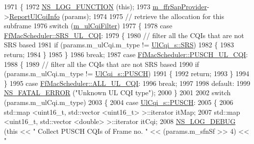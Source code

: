\begin{DoxyCode}
1971 \{
1972   \hyperlink{log-macros-disabled_8h_a90b90d5bad1f39cb1b64923ea94c0761}{NS\_LOG\_FUNCTION} (\textcolor{keyword}{this});
1973   \hyperlink{classns3_1_1PfFfMacScheduler_a40519746bd3f39a4b664db3036f2e3fd}{m\_ffrSapProvider}->\hyperlink{classns3_1_1LteFfrSapProvider_a14e6bcaf7db6afcb42f75122717313b1}{ReportUlCqiInfo} (params);
1974 
1975 \textcolor{comment}{// retrieve the allocation for this subframe}
1976   \textcolor{keywordflow}{switch} (\hyperlink{classns3_1_1FfMacScheduler_adae16e66a1c4231da80a1221297442cf}{m\_ulCqiFilter})
1977     \{
1978     \textcolor{keywordflow}{case} \hyperlink{classns3_1_1FfMacScheduler_aa47a9eb25f2c558c825b0be645304a52af2e0df473ba2c8f9cb131cb760591aed}{FfMacScheduler::SRS\_UL\_CQI}:
1979       \{
1980         \textcolor{comment}{// filter all the CQIs that are not SRS based}
1981         \textcolor{keywordflow}{if} (params.m\_ulCqi.m\_type != \hyperlink{structns3_1_1UlCqi__s_aece9e5ebea42eb9ff1744c72c8459b57af4b6dba4243636562c910c4d4761dd7e}{UlCqi\_s::SRS})
1982           \{
1983             \textcolor{keywordflow}{return};
1984           \}
1985       \}
1986       \textcolor{keywordflow}{break};
1987     \textcolor{keywordflow}{case} \hyperlink{classns3_1_1FfMacScheduler_aa47a9eb25f2c558c825b0be645304a52a4a833bc779439b15bd904e1dd8eaa563}{FfMacScheduler::PUSCH\_UL\_CQI}:
1988       \{
1989         \textcolor{comment}{// filter all the CQIs that are not SRS based}
1990         \textcolor{keywordflow}{if} (params.m\_ulCqi.m\_type != \hyperlink{structns3_1_1UlCqi__s_aece9e5ebea42eb9ff1744c72c8459b57a9716b20a3095c473ae3fde1eb5d0bb63}{UlCqi\_s::PUSCH})
1991           \{
1992             \textcolor{keywordflow}{return};
1993           \}
1994       \}
1995     \textcolor{keywordflow}{case} \hyperlink{classns3_1_1FfMacScheduler_aa47a9eb25f2c558c825b0be645304a52a84059a597c72335f0a5963c3efcbda71}{FfMacScheduler::ALL\_UL\_CQI}:
1996       \textcolor{keywordflow}{break};
1997 
1998     \textcolor{keywordflow}{default}:
1999       \hyperlink{group__fatal_ga5131d5e3f75d7d4cbfd706ac456fdc85}{NS\_FATAL\_ERROR} (\textcolor{stringliteral}{"Unknown UL CQI type"});
2000     \}
2001 
2002   \textcolor{keywordflow}{switch} (params.m\_ulCqi.m\_type)
2003     \{
2004     \textcolor{keywordflow}{case} \hyperlink{structns3_1_1UlCqi__s_aece9e5ebea42eb9ff1744c72c8459b57a9716b20a3095c473ae3fde1eb5d0bb63}{UlCqi\_s::PUSCH}:
2005       \{
2006         std::map <uint16\_t, std::vector <uint16\_t> >::iterator itMap;
2007         std::map <uint16\_t, std::vector <double> >::iterator itCqi;
2008         \hyperlink{group__logging_ga413f1886406d49f59a6a0a89b77b4d0a}{NS\_LOG\_DEBUG} (\textcolor{keyword}{this} << \textcolor{stringliteral}{" Collect PUSCH CQIs of Frame no. "} << (params.m\_sfnSf >> 4) << \textcolor{stringliteral}{"
}
\end{DoxyCode}
